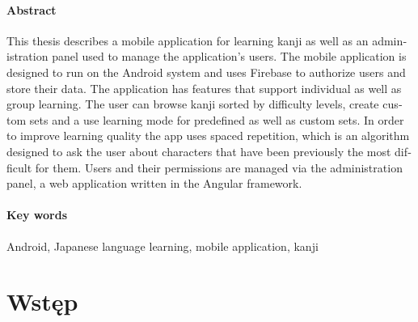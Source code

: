 \documentclass[a4paper,twoside,12pt]{book}
\newcounter{stronyPozaNumeracja}
\begin{document}
\subsubsection*{Abstract} 
\begin{otherlanguage}{british}

This thesis describes a mobile application for learning kanji as well as an administration panel used to manage the application's users. The mobile application is designed to run on the Android system and uses Firebase to authorize users and store their data. The application has features that support individual as well as group learning. The user can browse kanji sorted by difficulty levels, create custom sets and a use learning mode for predefined as well as custom sets. In order to improve learning quality the app uses spaced repetition, which is an algorithm designed to ask the user about characters that have been previously the most difficult for them. Users and their permissions are managed via the administration panel, a web application written in the Angular framework.

\end{otherlanguage}
\subsubsection*{Key words}  
\begin{otherlanguage}{british}
Android, Japanese language learning, mobile application, kanji
\end{otherlanguage}

\tableofcontents

\setcounter{stronyPozaNumeracja}{\value{page}}
\mainmatter
\pagestyle{empty}

\cleardoublepage

\pagestyle{NumeryStronNazwyRozdzialow}


\chapter{Wstęp}
\label{ch:wstep}
\end{document}
